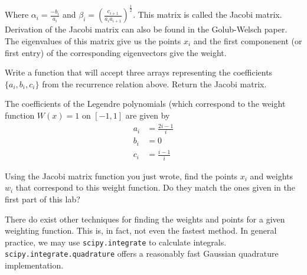 Where $\alpha_i = \frac{-b_i}{a_i}$ and $\beta_i = (\frac{c_{i+1}}{a_ia_{i+1}})^{\frac{1}{2}}$.  This matrix is called the Jacobi matrix.  Derivation of the Jacobi matrix can also be found in the Golub-Welsch paper.  The eigenvalues of this matrix give us the points $x_i$ and the first componenent (or first entry) of the corresponding eigenvectors give the weight.

\begin{problem}
Write a function that will accept three arrays representing the coefficients $\{a_i, b_i, c_i\}$ from the recurrence relation above.  Return the Jacobi matrix.
\end{problem}

\begin{problem}
The coefficients of the Legendre polynomials (which correspond to the weight function $W(x) = 1$ on $[-1,1]$ are given by
\begin{align*}
a_i &= \frac{2i - 1}{i} \\
b_i &= 0 \\
c_i &= \frac{i-1}{i}
\end{align*}

Using the Jacobi matrix function you just wrote, find the points $x_i$ and weights $w_i$ that correspond to this weight function.  Do they match the ones given in the first part of this lab?

\end{problem}


There do exist other techniques for finding the weights and points for a given weighting function.  This is, in fact, not even the fastest method.  In general practice, we may use {\tt scipy.integrate} to calculate integrals.  {\tt scipy.integrate.quadrature} offers a reasonably fast Gaussian quadrature implementation.

